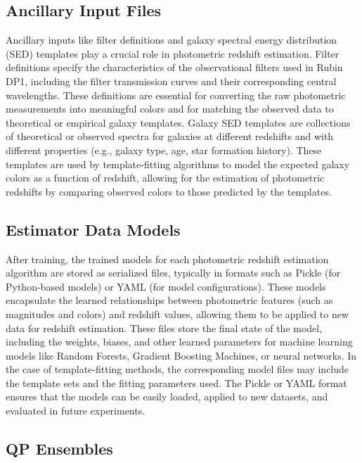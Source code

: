 \subsection{Ancillary Input Files}
\label{sec: products:algo_files}

Ancillary inputs like filter definitions and galaxy spectral energy distribution (SED) templates play a crucial role in photometric redshift estimation. Filter definitions specify the characteristics of the observational filters used in Rubin DP1, including the filter transmission curves and their corresponding central wavelengths. These definitions are essential for converting the raw photometric measurements into meaningful colors and for matching the observed data to theoretical or empirical galaxy templates. Galaxy SED templates are collections of theoretical or observed spectra for galaxies at different redshifts and with different properties (e.g., galaxy type, age, star formation history). These templates are used by template-fitting algorithms to model the expected galaxy colors as a function of redshift, allowing for the estimation of photometric redshifts by comparing observed colors to those predicted by the templates.


\subsection{Estimator Data Models}
\label{sec: products:models}

After training, the trained models for each photometric redshift estimation algorithm are stored as serialized files, typically in formats such as Pickle (for Python-based models) or YAML (for model configurations).  These models encapsulate the learned relationships between photometric features (such as magnitudes and colors) and redshift values, allowing them to be applied to new data for redshift estimation. These files store the final state of the model, including the weights, biases, and other learned parameters for machine learning models like Random Forests, Gradient Boosting Machines, or neural networks. In the case of template-fitting methods, the corresponding model files may include the template sets and the fitting parameters used. The Pickle or YAML format ensures that the models can be easily loaded, applied to new datasets, and evaluated in future experiments.


\subsection{QP Ensembles}
\label{sec: products:qp_ensembles}

